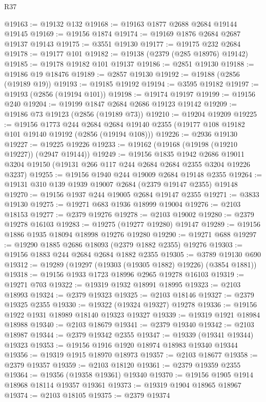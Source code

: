 \begin{lexlean}{R37}
\begin{coremodule}
@19163 := @19132 @132
@19168 := @19163 @1877 @2688 @2684 @19144 @19145
@19169 := @19156 @1874
@19174 := @19169 @1876 @2684 @2687 @19137 @19143
@19175 := @3551 @19130
@19177 := @19175 @232 @2684
@19178 := @19177 @101
@19182 := @19138 (@2379 (@285 @18976) @19142)
@19185 := @19178 @19182 @101 @19137
@19186 := @2851 @19130
@19188 := @19186 @19 @18476
@19189 := @2857 @19130
@19192 := @19188 (@2856 (@19189 @19))
@19193 := @19185 @19192
@19194 := @3595 @19182
@19197 := @19193 (@2856 (@19194 @101))
@19198 := @19174 @19197
@19199 := @19156 @240
@19204 := @19199 @1847 @2684 @2686 @19123 @19142
@19209 := @19186 @73 @19123 (@2856 (@19189 @73))
@19210 := @19204 @19209
@19225 := @19156
    @1773
    @244
    @2684
    @2684
    @19140
    @2355
    (@19177 @108 @19182 @101 @19140 @19192 (@2856 (@19194 @108)))
@19226 := @2936 @19130
@19227 := @19225 @19226
@19233 := @19162 (@19168 (@19198 (@19210 @19227)) (@2947 @19144))
@19249 := @19156
    @1835
    @1942
    @2686
    @19011
    @3204
    @19150
    (@19131 @266 @117 @244 @2684 @2684 @2355 @3204 @19226 @3237)
@19255 := @19156 @1940 @244 @19009 @2684 @19148 @2355
@19264 := @19131 @310 @139 @1939 @19007 @2684 (@2379 @19147 @2355) @19148
@19270 := @19156 @1937 @244 @19005 @2684 @19147 @2355
@19271 := @3833 @19130
@19275 := @19271 @683 @1936 @18999 @19004
@19276 := @2103 @18153
@19277 := @2379 @19276
@19278 := @2103 @19002
@19280 := @2379 @19278 @16103
@19283 := @19275 (@19277 @19280) @19147
@19289 := @19156 @1886 @1935 @18094 @18998 @19276 @19280
@19290 := @19271 @688
@19297 := @19290 @1885 @2686 @18093 (@2379 @1882 @2355) @19276
@19303 := @19156 @1883 @244 @2684 @2684 @1882 @2355
@19305 := @3789 @19130 @690
@19312 := @19289 (@19297 (@19303 (@19305 @1882) @19226) (@3854 @1881))
@19318 := @19156 @1933 @1723 @18996 @2965 @19278 @16103
@19319 := @19271 @703
@19322 := @19319 @1932 @18991 @18995
@19323 := @2103 @18993
@19324 := @2379 @19323
@19325 := @2103 @18146
@19327 := @2379 @19325 @2355
@19330 := @19322 (@19324 @19327) @19278
@19336 := @19156 @1922 @1931 @18989 @18140 @19323 @19327
@19339 := @19319 @1921 @18984 @18988
@19340 := @2103 @18679
@19341 := @2379 @19340
@19342 := @2103 @18987
@19344 := @2379 @19342 @2355
@19347 := @19339 (@19341 @19344) @19323
@19353 := @19156 @1916 @1920 @18974 @18983 @19340 @19344
@19356 := @19319 @1915 @18970 @18973
@19357 := @2103 @18677
@19358 := @2379 @19357
@19359 := @2103 @18120
@19361 := @2379 @19359 @2355
@19364 := @19356 (@19358 @19361) @19340
@19370 := @19156 @1905 @1914 @18968 @18114 @19357 @19361
@19373 := @19319 @1904 @18965 @18967
@19374 := @2103 @18105
@19375 := @2379 @19374

\end{coremodule}
\end{lexlean}

